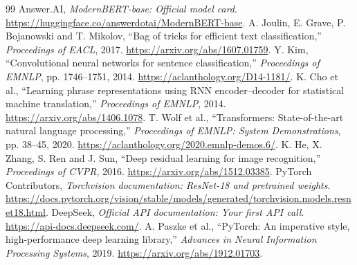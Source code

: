\documentclass[11pt,a4paper]{article}
\begin{document}
\begin{thebibliography}{99}
 Answer.AI, \emph{ModernBERT-base: Official model card}. \url{https://huggingface.co/answerdotai/ModernBERT-base}.
 A. Joulin, E. Grave, P. Bojanowski and T. Mikolov, ``Bag of tricks for efficient text classification,'' \emph{Proceedings of EACL}, 2017. \url{https://arxiv.org/abs/1607.01759}.
 Y. Kim, ``Convolutional neural networks for sentence classification,'' \emph{Proceedings of EMNLP}, pp. 1746--1751, 2014. \url{https://aclanthology.org/D14-1181/}.
 K. Cho et al., ``Learning phrase representations using RNN encoder--decoder for statistical machine translation,'' \emph{Proceedings of EMNLP}, 2014. \url{https://arxiv.org/abs/1406.1078}.
 T. Wolf et al., ``Transformers: State-of-the-art natural language processing,'' \emph{Proceedings of EMNLP: System Demonstrations}, pp. 38--45, 2020. \url{https://aclanthology.org/2020.emnlp-demos.6/}.
 K. He, X. Zhang, S. Ren and J. Sun, ``Deep residual learning for image recognition,'' \emph{Proceedings of CVPR}, 2016. \url{https://arxiv.org/abs/1512.03385}.
 PyTorch Contributors, \emph{Torchvision documentation: ResNet-18 and pretrained weights}. \url{https://docs.pytorch.org/vision/stable/models/generated/torchvision.models.resnet18.html}.
 DeepSeek, \emph{Official API documentation: Your first API call}. \url{https://api-docs.deepseek.com/}.
 A. Paszke et al., ``PyTorch: An imperative style, high-performance deep learning library,'' \emph{Advances in Neural Information Processing Systems}, 2019. \url{https://arxiv.org/abs/1912.01703}.
\end{thebibliography}
\end{document}
